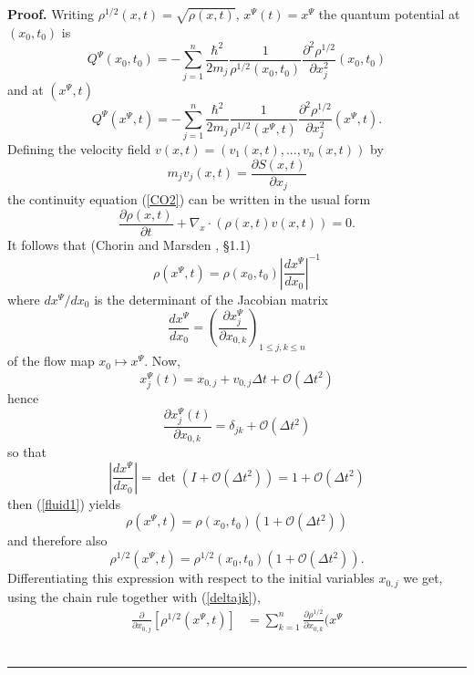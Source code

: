 \documentclass[12pt]{article}%
\newenvironment{proof}[1][Proof]{\noindent\textbf{#1.} }{\ \rule{0.5em}{0.5em}}
\begin{document}
\begin{proof}
Writing $\rho^{1/2}(x,t)=\sqrt{\rho(x,t)}$, $x^{\Psi}(t)=x^{\Psi}$ the quantum
potential at $(x_{0},t_{0})$ is
\[
Q^{\Psi}(x_{0},t_{0})=-\sum_{j=1}^{n}\frac{\hbar^{2}}{2m_{j}}\frac{1}%
{\rho^{1/2}(x_{0},t_{0})}\frac{\partial^{2}\rho^{1/2}}{\partial x_{j}^{2}%
}(x_{0},t_{0})
\]
and at $(x^{\Psi},t)$
\[
Q^{\Psi}(x^{\Psi},t)=-\sum_{j=1}^{n}\frac{\hbar^{2}}{2m_{j}}\frac{1}%
{\rho^{1/2}(x^{\Psi},t)}\frac{\partial^{2}\rho^{1/2}}{\partial x_{j}^{2}%
}(x^{\Psi},t).
\]
Defining the velocity field $v(x,t)=(v_{1}(x,t),...,v_{n}(x,t))$ by
\[
m_{j}v_{j}(x,t)=\frac{\partial S(x,t)}{\partial x_{j}}%
\]
the continuity equation (\ref{CO2}) can be written in the usual form%
\begin{equation}
\frac{\partial\rho(x,t)}{\partial t}+\nabla_{x}\cdot\left(  \rho
(x,t)v(x,t)\right)  =0.
\end{equation}
It follows that (Chorin and Marsden \cite{fluid}, \S 1.1)
\begin{equation}
\rho(x^{\Psi},t)=\rho(x_{0},t_{0})\left\vert \frac{dx^{\Psi}}{dx_{0}%
}\right\vert ^{-1} \label{fluid1}%
\end{equation}
where $dx^{\Psi}/dx_{0}$ is the determinant of the Jacobian matrix
\[
\frac{dx^{\Psi}}{dx_{0}}=\left(  \frac{\partial x_{j}^{\Psi}}{\partial
x_{0,k}}\right)  _{1\leq j,k\leq n}%
\]
of the flow map $x_{0}\longmapsto x^{\Psi}$. Now,%
\[
x_{j}^{\Psi}(t)=x_{0,j}+v_{0,j}\Delta t+\mathcal{O}(\Delta t^{2})
\]
hence%
\begin{equation}
\frac{\partial x_{j}^{\Psi}(t)}{\partial x_{0,k}}=\delta_{jk}+\mathcal{O}%
(\Delta t^{2}) \label{deltajk}%
\end{equation}
so that
\[
\left\vert \frac{dx^{\Psi}}{dx_{0}}\right\vert =\det(I+\mathcal{O}(\Delta
t^{2}))=1+\mathcal{O}(\Delta t^{2})
\]
then (\ref{fluid1}) yields%
\begin{equation}
\rho(x^{\Psi},t)=\rho(x_{0},t_{0})(1+\mathcal{O}(\Delta t^{2}))
\label{rhodelta}%
\end{equation}
and therefore also%
\begin{equation}
\rho^{1/2}(x^{\Psi},t)=\rho^{1/2}(x_{0},t_{0})(1+\mathcal{O}(\Delta t^{2})).
\label{rhohalf}%
\end{equation}
Differentiating this expression with respect to the initial variables
$x_{0,j}$ we get, using the chain rule together with (\ref{deltajk}),%
\begin{align*}
\frac{\partial}{\partial x_{0,j}}\left[  \rho^{1/2}(x^{\Psi},t)\right]   &
=\sum_{k=1}^{n}\frac{\partial\rho^{1/2}}{\partial x_{0,k}}(x^{\Psi}%

\end{align*}
\end{proof}
\end{document}
